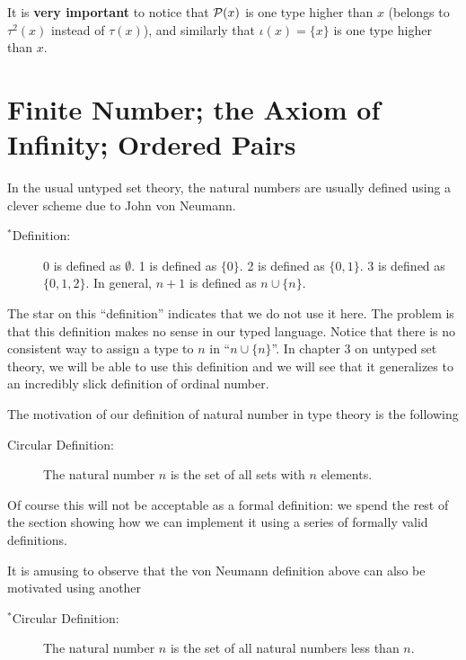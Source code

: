 \documentclass[12pt]{book}
\begin{document}
It is {\bf very important} to notice that ${\cal P}(x)$ is one type
higher than $x$ (belongs to $\tau^2(x)$ instead of $\tau(x)$), and similarly that $\iota(x)=\{x\}$ is one type higher than
$x$.



\section{Finite Number; the Axiom of Infinity; Ordered Pairs}

In the usual untyped set theory, the natural numbers are usually
defined using a clever scheme due to John von Neumann.

\begin{description}

\item[$^*$Definition:] 0 is defined as $\emptyset$.  1 is defined as
$\{0\}$.  2 is defined as $\{0,1\}$.  3 is defined as $\{0,1,2\}$.  In
general, $n+1$ is defined as $n \cup \{n\}$.

\end{description}

The star on this ``definition'' indicates that we do not use it here.
The problem is that this definition makes no sense in our typed
language.  Notice that there is no consistent way to assign a type to
$n$ in ``$n \cup \{n\}$''.  In chapter 3 on untyped set theory, we
will be able to use this definition and we will see that it
generalizes to an incredibly slick definition of ordinal number.

The motivation of our definition of natural number in type theory is
the following

\begin{description}

\item[Circular Definition:] The natural number $n$ is the set of all
sets with $n$ elements.

\end{description}

Of course this will not be acceptable as a formal definition:  we spend the rest of the section showing how we can implement it using a series of formally valid definitions.

It is amusing to observe that the von Neumann definition above can
also be motivated using another

\begin{description}

\item[$^*$Circular Definition:] The natural number $n$ is the set of
all natural numbers less than $n$.

\end{description}
\end{document}
